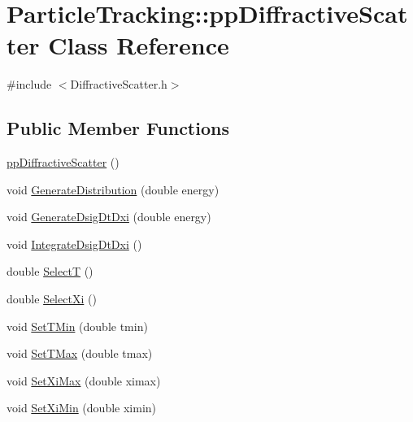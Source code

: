 \hypertarget{classParticleTracking_1_1ppDiffractiveScatter}{}\section{Particle\+Tracking\+:\+:pp\+Diffractive\+Scatter Class Reference}
\label{classParticleTracking_1_1ppDiffractiveScatter}


{\ttfamily \#include $<$Diffractive\+Scatter.\+h$>$}

\subsection*{Public Member Functions}
\begin{DoxyCompactItemize}
\item 
\hyperlink{classParticleTracking_1_1ppDiffractiveScatter_a1127d26a2b1b95632ed823ef803a855b}{pp\+Diffractive\+Scatter} ()
\item 
void \hyperlink{classParticleTracking_1_1ppDiffractiveScatter_adaec9271ebbbc79bf484f5bbd7e89605}{Generate\+Distribution} (double energy)
\item 
void \hyperlink{classParticleTracking_1_1ppDiffractiveScatter_aea40467446793fb960701530018efdc5}{Generate\+Dsig\+Dt\+Dxi} (double energy)
\item 
void \hyperlink{classParticleTracking_1_1ppDiffractiveScatter_afa8a735da9c32b48a09f014a00ea8265}{Integrate\+Dsig\+Dt\+Dxi} ()
\item 
double \hyperlink{classParticleTracking_1_1ppDiffractiveScatter_ab76465efcf0e83555243d73f93a7049b}{SelectT} ()
\item 
double \hyperlink{classParticleTracking_1_1ppDiffractiveScatter_a09ef68dfe8abc179ccabb766b0c46be1}{Select\+Xi} ()
\item 
void \hyperlink{classParticleTracking_1_1ppDiffractiveScatter_a7daeefd79f8f288f6edc0b85c2acc1c7}{Set\+T\+Min} (double tmin)
\item 
void \hyperlink{classParticleTracking_1_1ppDiffractiveScatter_a31b1bc459e301f2a4ae78f2caa803ec0}{Set\+T\+Max} (double tmax)
\item 
void \hyperlink{classParticleTracking_1_1ppDiffractiveScatter_acfd8385c3ee1f3e710a1c7ef15183039}{Set\+Xi\+Max} (double ximax)
\item 
void \hyperlink{classParticleTracking_1_1ppDiffractiveScatter_a8138fee1bfa1b108e2862a1f56024fa8}{Set\+Xi\+Min} (double ximin)
\item 

\end{DoxyCompactItemize}
